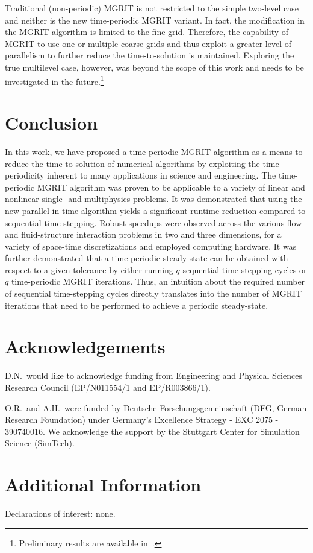 \documentclass[3p]{elsarticle}
\begin{document}
Traditional (non-periodic) MGRIT is not restricted to the simple two-level case
and neither is the new time-periodic MGRIT variant.
In fact, the modification in the MGRIT algorithm is limited to the fine-grid.
Therefore, the capability of MGRIT to use one or multiple coarse-grids
and thus exploit a greater level of parallelism
to further reduce the time-to-solution is maintained.
Exploring the true multilevel case, however, was beyond the scope of this work
and needs to be investigated in the future.\footnote{Preliminary
results are available in~\cite{Hessenthaler2020_PhD}.}
\section{Conclusion}\label{conclusion-sec}
In this work, we have proposed a time-periodic MGRIT algorithm
as a means to reduce the time-to-solution of numerical algorithms
by exploiting the time periodicity inherent to many applications
in science and engineering.
The time-periodic MGRIT algorithm was proven to be applicable
to a variety of linear and nonlinear single- and multiphysics problems.
It was demonstrated that using the new parallel-in-time algorithm
yields a significant runtime reduction compared to sequential time-stepping.
Robust speedups were observed across the various flow and fluid-structure interaction problems
in two and three dimensions,
for a variety of space-time discretizations and employed computing hardware.
It was further demonstrated that a time-periodic steady-state can be obtained
with respect to a given tolerance
by either running $q$ sequential time-stepping cycles or $q$ time-periodic MGRIT iterations.
Thus,
an intuition about the required number of sequential time-stepping cycles directly
translates into the number of MGRIT iterations that need to be performed to achieve a periodic steady-state.
\section{Acknowledgements}
D.N.\ would like to acknowledge funding from Engineering
and Physical Sciences Research Council (EP/N011554/1 and EP/R003866/1).

O.R.\ and A.H.\ were funded by Deutsche Forschungsgemeinschaft
(DFG, German Research Foundation) under Germany's Excellence Strategy
- EXC 2075 - 390740016.
We acknowledge the support
by the Stuttgart Center for Simulation Science (SimTech).
\section*{Additional Information}
Declarations of interest: none.\\[1ex]
\end{document}
